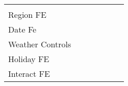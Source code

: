 \begin{table}[ht]
\begin{threeparttable}
{\begin{tabular}{l*{6}{c}}
				\\\\
				Region FE           &              \checkmark         &         \checkmark         &         \checkmark         &         \checkmark         &         \checkmark         &         \checkmark         \\
				Date Fe             &              \checkmark         &         \checkmark         &         \checkmark         &         \checkmark         &         \checkmark         &         \checkmark         \\
				Weather Controls    &              \checkmark         &         \checkmark         &         \checkmark         &         \checkmark         &         \checkmark         &         \checkmark         \\
				Holiday FE          &              \checkmark         &         \checkmark         &         \checkmark         &         \checkmark         &         \checkmark         &         \checkmark         \\
				Interact FE         &              \checkmark         &         \checkmark         &         \checkmark         &         \checkmark         &         \checkmark         &         \checkmark         \\
				\bottomrule 
		\end{tabular}}
		\begin{tablenotes} 

\end{tablenotes}
\end{threeparttable}
\end{table}
